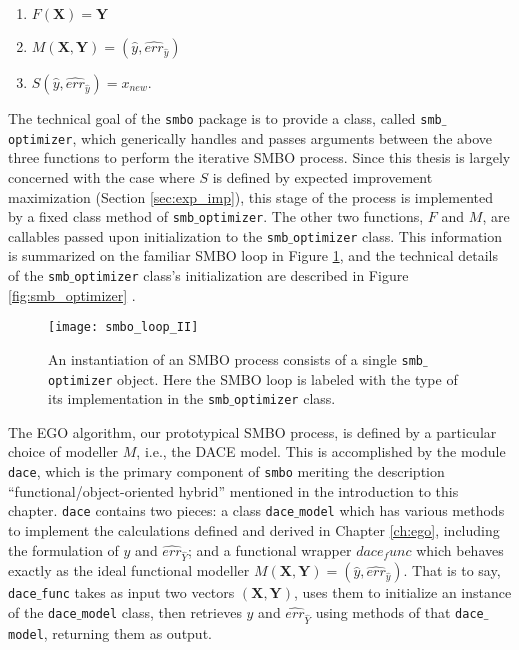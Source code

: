 \begin{enumerate}
\item $F(\mathbf{X})=\mathbf{Y}$
\item $M(\mathbf{X},\mathbf{Y}) = (\hat{y},\hat{err}_{\hat{y}})$
\item $S(\hat{y},\hat{err}_{\hat{y}}) = x_{new}$.
\end{enumerate}


The technical goal of the \texttt{smbo} package is to provide a class, called \texttt{smb$\_$optimizer}, which generically handles and passes arguments between the above three functions to perform the iterative SMBO process. Since this thesis is largely concerned with the case where $S$ is defined by expected improvement maximization (Section \ref{sec:exp_imp}), this stage of the process is implemented by a fixed class method of \texttt{smb$\_$optimizer}. The other two functions, $F$ and $M$, are callables passed upon initialization to the \texttt{smb$\_$optimizer} class. This information is summarized on the familiar SMBO loop in Figure \ref{fig:smbo_loop_II}, and the technical details of the \texttt{smb$\_$optimizer} class's initialization are described in Figure \ref{fig:smb_optimizer} .

\begin{figure}[h]
	\centering
	\texttt{[image: smbo\_loop\_II]}
	\caption{An instantiation of an SMBO process consists of a single \texttt{smb$\_$optimizer} object. Here the SMBO loop is labeled with the type of its implementation in the \texttt{smb$\_$optimizer} class.}
	\label{fig:smbo_loop_II}

\end{figure}


The EGO algorithm, our prototypical SMBO process, is defined by a particular choice of modeller $M$, i.e., the DACE model. This is accomplished by the module \texttt{dace}, which is the primary component of \texttt{smbo} meriting the description ``functional/object-oriented hybrid'' mentioned in the introduction to this chapter. \texttt{dace} contains two pieces: a class \texttt{dace$\_$model} which has various methods to implement the calculations defined and derived in Chapter \ref{ch:ego}, including the formulation of $\hat{y}$ and $\hat{err}_{\hat{Y}}$; and a functional wrapper $dace_func$ which behaves exactly as the ideal functional modeller $M(\mathbf{X},\mathbf{Y}) = (\hat{y},\hat{err}_{\hat{y}})$. That is to say, \texttt{dace$\_$func} takes as input two vectors $(\mathbf{X},\mathbf{Y})$, uses them to initialize an instance of the \texttt{dace$\_$model} class, then retrieves $\hat{y}$ and $\hat{err}_{\hat{Y}}$ using methods of that \texttt{dace$\_$model}, returning them as output.

